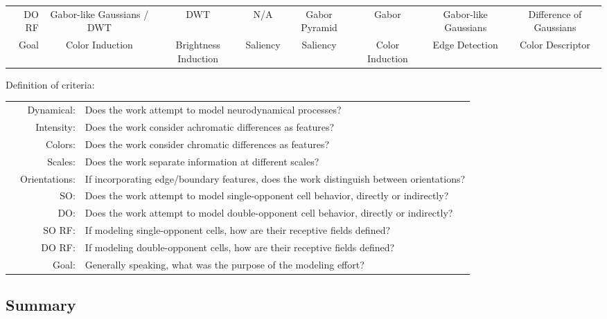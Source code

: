 \documentclass[journal,onecolumn]{IEEEtran}
\begin{document}
\begin{table}[H]
{\begin{threeparttable}
\begin{tabular}{rccccccc}
        \multicolumn{1}{r|}{DO RF}        & Gabor-like Gaussians / DWT & DWT                             & N/A               & Gabor Pyramid         & Gabor                       & Gabor-like Gaussians   & Difference of Gaussians \\
        \multicolumn{1}{r|}{Goal}         & Color Induction            & Brightness Induction            & Saliency          & Saliency              & Color Induction             & Edge Detection         & Color Descriptor                     
    \end{tabular}
    \begin{tablenotes}
        \item Definition of criteria:
        \begin{tabular}{p{1.5cm} r l}
            & Dynamical:    & Does the work attempt to model neurodynamical processes? \\
            & Intensity:    & Does the work consider achromatic differences as features? \\
            & Colors:       & Does the work consider chromatic differences as features? \\
            & Scales:       & Does the work separate information at different scales? \\
            & Orientations: & If incorporating edge/boundary features, does the work distinguish between orientations? \\
            & SO:           & Does the work attempt to model single-opponent cell behavior, directly or indirectly? \\
            & DO:           & Does the work attempt to model double-opponent cell behavior, directly or indirectly? \\
            & SO RF:        & If modeling single-opponent cells, how are their receptive fields defined? \\
            & DO RF:        & If modeling double-opponent cells, how are their receptive fields defined? \\
            & Goal:         & Generally speaking, what was the purpose of the modeling effort?
        \end{tabular}
    \end{tablenotes}
    \end{threeparttable}
    }
\end{table}


\subsection{Summary}
\end{document}

